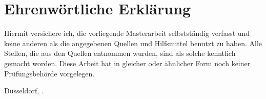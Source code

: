 \chapter*{Ehrenwörtliche Erklärung}

Hiermit versichere ich, die vorliegende Masterarbeit selbstständig 
verfasst und keine anderen als die angegebenen Quellen und Hilfsmittel
benutzt zu haben.
Alle Stellen, die aus den Quellen entnommen
wurden, sind als solche kenntlich gemacht worden. Diese Arbeit hat in
gleicher oder ähnlicher Form noch keiner Prüfungsbehörde vorgelegen.

\vspace{3cm}

\noindent Düsseldorf, \thesissubmissionday{}.\thesissubmissionmonth{} \thesissubmissionyear{} \hfill \thesisauthor{}
